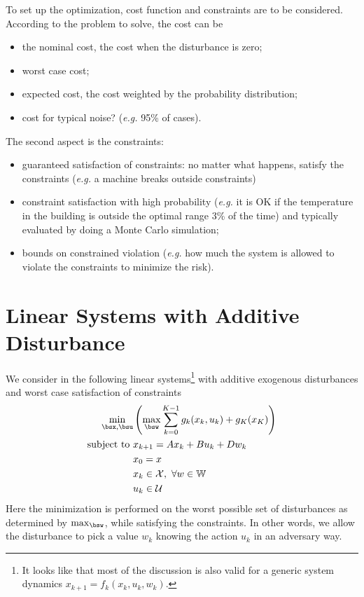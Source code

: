 To set up the optimization, cost function and constraints are to be considered. According to the problem to solve, the cost can be
\begin{itemize}
\item the nominal cost, the cost when the disturbance is zero;
\item worst case cost;
\item expected cost, the cost weighted by the probability distribution;
\item cost for typical noise? (\textit{e.g.} 95\% of cases).
\end{itemize}
The second aspect is the constraints:
\begin{itemize}
\item guaranteed satisfaction of constraints: no matter what happens, satisfy the constraints (\textit{e.g.} a machine breaks outside constraints)
\item constraint satisfaction with high probability (\textit{e.g.} it is OK if the temperature in the building is outside the optimal range 3\% of the time) and typically evaluated by doing a Monte Carlo simulation;
\item bounds on constrained violation (\textit{e.g.} how much the system is allowed to violate the constraints to minimize the risk).
\end{itemize}

\section{Linear Systems with Additive Disturbance}
\label{sec:linear-system-additive-disturbance}

We consider in the following linear systems\footnote{It looks like that most of the discussion is also valid for a generic system dynamics $x_{k+1}=f_k(x_k,u_k,w_k)$.} with additive exogenous disturbances and worst case satisfaction of constraints
\begin{equation}
  \label{eq:minimization-additive-disturbance}
  \begin{aligned}
    \min_{\bsx,\bsu} & \left(\max_{\bsw} \sum_{k=0}^{K-1} g_k(x_k,u_k) + g_K(x_K)\right) \\
    \text{subject to } & x_{k+1} = Ax_k + Bu_k+Dw_k \\
                     & x_0 = x \\
                     & x_k \in \mathcal{X},\ \forall w \in \mathbb{W} \\
                     & u_k \in \mathcal{U}
  \end{aligned}
\end{equation}
Here the minimization is performed on the worst possible set of disturbances as determined by $\max_{\bsw}$, while satisfying the constraints. In other words, we allow the disturbance to pick a value $w_k$ knowing the action $u_k$ in an adversary way.

